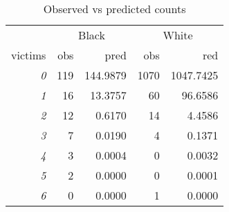 \begin{wraptable}{r}{3in}

\caption{\label{tab:obs_vs_pred}Observed vs predicted counts}
\centering
\fontsize{9}{11}\selectfont
\begin{tabular}[t]{>{}rrrrr}
\toprule
\multicolumn{1}{c}{ } & \multicolumn{2}{c}{Black} & \multicolumn{2}{c}{White} \\
\cmidrule(l{3pt}r{3pt}){2-3} \cmidrule(l{3pt}r{3pt}){4-5}
victims & obs & pred & obs & red\\
\midrule
\em{0} & 119 & 144.9879 & 1070 & 1047.7425\\
\em{1} & 16 & 13.3757 & 60 & 96.6586\\
\em{2} & 12 & 0.6170 & 14 & 4.4586\\
\em{3} & 7 & 0.0190 & 4 & 0.1371\\
\em{4} & 3 & 0.0004 & 0 & 0.0032\\
\addlinespace
\em{5} & 2 & 0.0000 & 0 & 0.0001\\
\em{6} & 0 & 0.0000 & 1 & 0.0000\\
\bottomrule
\end{tabular}
\end{wraptable}
